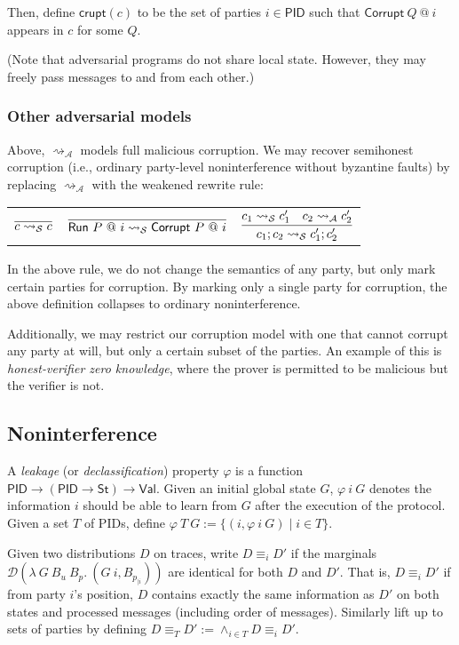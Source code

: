 \documentclass{article}
\newcommand{\Val}{\mathsf{Val}}
\newcommand{\St}{\mathsf{St}}
\newcommand{\PID}{\mathsf{PID}}
\begin{document}
Then, define $\mathsf{crupt}(c)$ to be the set of parties $i \in \PID$ such that $\textsf{Corrupt}\ Q\ @\ i$ appears in $c$ for some $Q$.

(Note that adversarial programs do not share local state. However, they may freely pass messages to and from each other.)

\subsubsection{Other adversarial models}

Above, $\rightsquigarrow_\mathcal{A}$ models full malicious corruption. We may recover semihonest corruption (i.e., ordinary party-level noninterference without byzantine faults) by replacing $\rightsquigarrow_\mathcal{A}$ with the weakened rewrite rule:

\begin{tabular}{ccc}
    $\infer{c \rightsquigarrow_{\mathcal{S}} c}{}$ & 
    $\infer{\textsf{Run}\ P\ @\ i \rightsquigarrow_{\mathcal{S}} \textsf{Corrupt}\ P\ @\ i}{}$ &
    $\infer{c_1;c_2 \rightsquigarrow_{\mathcal{S}} c_1'; c_2'} {c_1 \rightsquigarrow_\mathcal{S} c_1' & c_2 \rightsquigarrow_\mathcal{A} c_2'}$ \\
\end{tabular}

In the above rule, we do not change the semantics of any party, but only mark certain parties for corruption. By marking only a single party for corruption, the above definition collapses to ordinary noninterference.

Additionally, we may restrict our corruption model with one that cannot corrupt any party at will, but only a certain subset of the parties. An example of this is \emph{honest-verifier zero knowledge}, where the prover is permitted to be malicious but the verifier is not.

\subsection{Noninterference}

A \emph{leakage} (or \emph{declassification}) property $\varphi$ is a function $\PID \to (\PID \to \St) \to \Val$. Given an initial global state $G$, $\varphi\ i\ G$ denotes the information $i$ should be able to learn from $G$ after the execution of the protocol. Given a set $T$ of PIDs, define $\varphi\ T\ G := \{(i, \varphi\ i\ G) \mid i \in T\}$.

Given two distributions $D$ on traces, write $D \equiv_i D'$ if the marginals $\mathcal{D} (\lambda\ G\ B_u\ B_p.\ (G\ i, B_{p_{| i}}))$ are identical for both $D$ and $D'$. That is, $D \equiv_i D'$ if from party $i$'s position, $D$ contains exactly the same information as $D'$ on both states and processed messages (including order of messages). Similarly lift up to sets of parties by defining $D \equiv_T D' := \wedge_{i \in T} D \equiv_i D'$.
\end{document}
